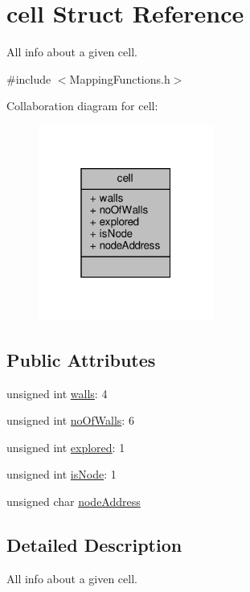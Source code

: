 \hypertarget{structcell}{}\section{cell Struct Reference}
\label{structcell}


All info about a given cell.  




{\ttfamily \#include $<$Mapping\+Functions.\+h$>$}



Collaboration diagram for cell\+:
\nopagebreak
\begin{figure}[H]
\begin{center}
\leavevmode
\includegraphics[width=163pt]{structcell__coll__graph}
\end{center}
\end{figure}
\subsection*{Public Attributes}
\begin{DoxyCompactItemize}
\item 
unsigned int \hyperlink{structcell_a9a2929dcb308b9eb30f19cddebcc5c52}{walls}\+: 4
\item 
unsigned int \hyperlink{structcell_a8d23cc3f76831a9bcf536b77ba272848}{no\+Of\+Walls}\+: 6
\item 
unsigned int \hyperlink{structcell_aefc3f7506ad8c2ad9f31e7d9ba093828}{explored}\+: 1
\item 
unsigned int \hyperlink{structcell_aaa0cb97f34f5d696c6d7f2ef154fbfc8}{is\+Node}\+: 1
\item 
unsigned char \hyperlink{structcell_a0b372a9239a2ed20cde6edb427069bd8}{node\+Address}
\end{DoxyCompactItemize}


\subsection{Detailed Description}
All info about a given cell. 

